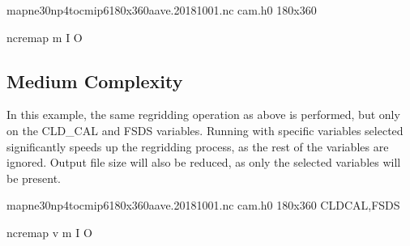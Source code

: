 \documentclass[letterpaper,10pt,english]{sphinxmanual}
\begin{document}
\begin{sphinxVerbatim}[commandchars=\\\{\}]
map\PYGZus{}ne30np4\PYGZus{}to\PYGZus{}cmip6\PYGZus{}180x360\PYGZus{}aave.20181001.nc    
cam.h0                                         
180x360                                       

ncremap \PYGZhy{}m  \PYGZhy{}I  \PYGZhy{}O 
\end{sphinxVerbatim}


\subsection{Medium Complexity}
\label{\detokenize{atm_regrid:medium-complexity}}
In this example, the same regridding operation as above is performed, but only on the CLD\_CAL and FSDS variables.
Running with specific variables selected significantly speeds up the regridding process, as the rest of the variables are ignored.
Output file size will also be reduced, as only the selected variables will be present.

\begin{sphinxVerbatim}[commandchars=\\\{\}]
map\PYGZus{}ne30np4\PYGZus{}to\PYGZus{}cmip6\PYGZus{}180x360\PYGZus{}aave.20181001.nc   
cam.h0                                        
180x360                                      
CLD\PYGZus{}CAL,FSDS                                       

ncremap \PYGZhy{}v  \PYGZhy{}m  \PYGZhy{}I  \PYGZhy{}O 
\end{sphinxVerbatim}
\end{document}
